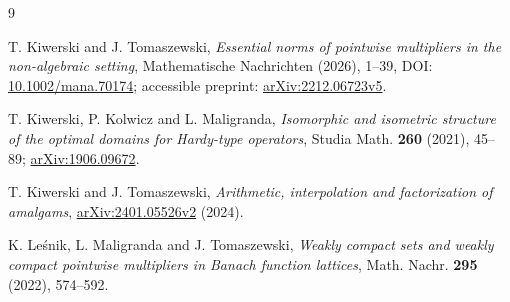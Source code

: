 \documentclass[11pt]{article}
\theoremstyle{remark}
\begin{document}
\begin{thebibliography}{9}

T. Kiwerski and J. Tomaszewski,
\emph{Essential norms of pointwise multipliers in the non-algebraic setting},
Mathematische Nachrichten (2026), 1--39,
DOI: \href{https://doi.org/10.1002/mana.70174}{10.1002/mana.70174};
accessible preprint: \href{https://arxiv.org/abs/2212.06723}{arXiv:2212.06723v5}.

T. Kiwerski, P. Kolwicz and L. Maligranda,
\emph{Isomorphic and isometric structure of the optimal domains for
Hardy-type operators},
Studia Math. \textbf{260} (2021), 45--89;
\href{https://arxiv.org/abs/1906.09672}{arXiv:1906.09672}.

T. Kiwerski and J. Tomaszewski,
\emph{Arithmetic, interpolation and factorization of amalgams},
\href{https://arxiv.org/abs/2401.05526}{arXiv:2401.05526v2} (2024).

K. Le\'snik, L. Maligranda and J. Tomaszewski,
\emph{Weakly compact sets and weakly compact pointwise multipliers in Banach
function lattices},
Math. Nachr. \textbf{295} (2022), 574--592.

\end{thebibliography}
\end{document}
